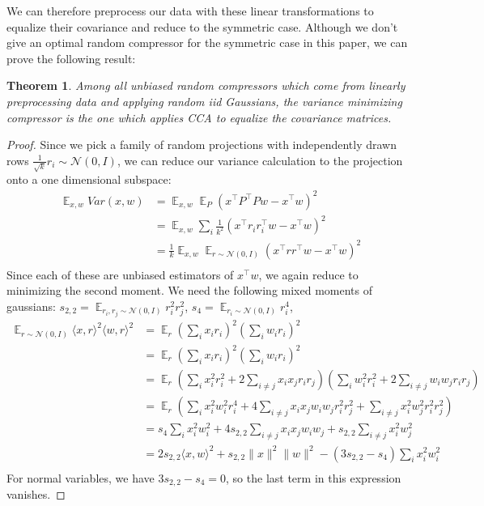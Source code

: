 \documentclass{article}
\newtheorem{theorem}{Theorem}[section]
\theoremstyle{definition}
\theoremstyle{plain}
\DeclareMathOperator{\E}{\mathbb{E}}
\begin{document}
We can therefore preprocess our data with these linear transformations to equalize their covariance and reduce to the symmetric case. Although we don't give an optimal random compressor for the symmetric case in this paper, we can prove the following result:
\begin{theorem}
Among all unbiased random compressors which come from linearly preprocessing data and applying random iid Gaussians, the variance minimizing compressor is the one which applies CCA to equalize the covariance matrices.
\end{theorem}
\begin{proof}
Since we pick a family of random projections with independently drawn rows $\frac{1}{\sqrt{k}} r_i \sim \mathcal{N}(0,I)$, we can reduce our variance calculation to the projection onto a one dimensional subspace:
\begin{align*}
\E_{x,w} Var(x,w) &= \E_{x,w} \E_P (x^\top P^\top P w- x^\top w)^2  \\
&= \E_{x,w} \sum_i \frac{1}{k^2} (x^\top r_i r_i^\top w - x^\top w)^2 \\
&= \frac{1}{k} \E_{x,w} \E_{r \sim \mathcal{N}(0,I)} (x^\top r r^\top w - x^\top w)^2 \\ 
\end{align*}
Since each of these are unbiased estimators of $x^\top w$, we again reduce to minimizing the second moment. We need the following mixed moments of gaussians: $s_{2,2} = \E_{r_i,r_j \sim \mathcal{N}(0,I)} r_i^2 r_j^2$, $s_{4} = \E_{r_i \sim \mathcal{N}(0,I)} r_i^4$, 
\begin{align*}
    \E_{r \sim \mathcal{N}(0,I)} \langle x, r \rangle^2 \langle w, r \rangle^2 &= \E_r \left( \sum_i x_i r_i \right)^2 \left( \sum_i w_i r_i \right)^2\\
 &= \E_{r} (\sum_i x_i r_i)^2 (\sum_i w_i r_i)^2 \\
&=\E_r (\sum_i x_i^2 r_i^2 + 2 \sum_{i\neq j} x_i x_j r_i r_j ) (\sum_i w_i^2 r_i^2 + 2 \sum_{i\neq j} w_i w_j r_i r_j )\\
&= \E_r (\sum_i x_i^2 w_i^2 r_i^4 + 4 \sum_{i \neq j} x_i x_j w_i w_j r_i^2 r_j^2 + \sum_{i \neq j} x_i^2 w_j^2 r_i^2 r_j^2) \\
&= s_4 \sum_i x_i^2 w_i^2  + 4 s_{2,2} \sum_{i \neq j} x_i x_j w_i w_j  + s_{2,2} \sum_{i \neq j} x_i^2 w_j^2 \\
&= 2 s_{2,2} \langle x, w \rangle^2 + s_{2,2} \|x\|^2 \|w\|^2 - (3 s_{2,2} - s_4) \sum_i x_i^2 w_i^2\\
\end{align*}
For normal variables, we have $3 s_{2,2} - s_4 = 0$, so the last term in this expression vanishes. 


\end{proof}
\end{document}
